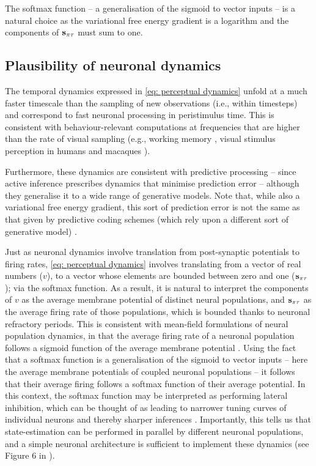 \documentclass{article}
\begin{document}
The softmax function – a generalisation of the sigmoid to vector inputs – is a natural choice as the variational free energy gradient is a logarithm and the components of $\bold s_{\pi\tau}$ must sum to one.

\subsection{Plausibility of neuronal dynamics}

The temporal dynamics expressed in \eqref{eq: perceptual dynamics} unfold at a much faster timescale than the sampling of new observations (i.e., within timesteps) and correspond to fast neuronal processing in peristimulus time. This is consistent with behaviour-relevant computations at frequencies that are higher than the rate of visual sampling (e.g., working memory \cite{lundqvistGammaBetaBursts2016}, visual stimulus perception in humans \cite{hanslmayrPrestimulusOscillatoryPhase2013} and macaques \cite{rollsProcessingSpeedCerebral1994}).

Furthermore, these dynamics are consistent with predictive processing \cite{raoPredictiveCodingVisual1999,bastosCanonicalMicrocircuitsPredictive2012} -- since active inference prescribes dynamics that minimise prediction error -- although they generalise it to a wide range of generative models. Note that, while also a variational free energy gradient, this sort of prediction error is not the same as that given by predictive coding schemes (which rely upon a different sort of generative model) \cite{buckleyFreeEnergyPrinciple2017,fristonVariationalFreeEnergy2007,bogaczTutorialFreeenergyFramework2017}.

Just as neuronal dynamics involve translation from post-synaptic potentials to firing rates, \eqref{eq: perceptual dynamics} involves translating from a vector of real numbers ($v$), to a vector whose elements are bounded between zero and one ($\bold s_{\pi\tau}$); via the softmax function. As a result, it is natural to interpret the components of $v$ as the average membrane potential of distinct neural populations, and $\bold s_{\pi\tau}$ as the average firing rate of those populations, which is bounded thanks to neuronal refractory periods. This is consistent with mean-field formulations of neural population dynamics, in that the average firing rate of a neuronal population follows a sigmoid function of the average membrane potential \cite{marreirosPopulationDynamicsVariance2008,decoDynamicBrainSpiking2008,moranNeuralMassesFields2013}.
Using the fact that a softmax function is a generalisation of the sigmoid to vector inputs -- here the average membrane potentials of coupled neuronal populations -- it follows that their average firing follows a softmax function of their average potential. In this context, the softmax function may be interpreted as performing lateral inhibition, which can be thought of as leading to narrower tuning curves of individual neurons and thereby sharper inferences \cite{vonbekesySensoryInhibition1967}. Importantly, this tells us that state-estimation can be performed in parallel by different neuronal populations, and a simple neuronal architecture is sufficient to implement these dynamics (see Figure 6 in \cite{parrNeuronalMessagePassing2019}).
\end{document}
